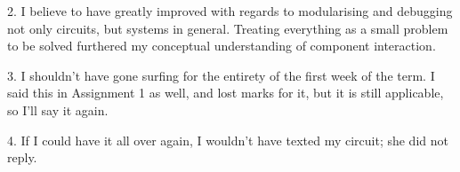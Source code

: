 2. I believe to have greatly improved with regards to modularising and debugging not only circuits, but systems in general. Treating everything as a small problem to be solved furthered my conceptual understanding of component interaction.

3. I shouldn't have gone surfing for the entirety of the first week of the term. I said this in Assignment 1 as well, and lost marks for it, but it is still applicable, so I'll say it again.

4. If I could have it all over again, I wouldn't have texted my circuit; she did not reply.